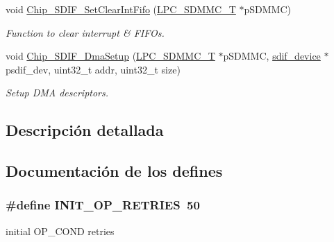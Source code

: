 \begin{DoxyCompactItemize}
void \hyperlink{group___s_d_i_f__18_x_x__43_x_x_ga8b2559327fedf08efe8a5e87ba6f6e54}{Chip\+\_\+\+S\+D\+I\+F\+\_\+\+Set\+Clear\+Int\+Fifo} (\hyperlink{struct_l_p_c___s_d_m_m_c___t}{L\+P\+C\+\_\+\+S\+D\+M\+M\+C\+\_\+T} $\ast$p\+S\+D\+M\+MC)
\begin{DoxyCompactList}\small\item\em Function to clear interrupt \& F\+I\+F\+Os. \end{DoxyCompactList}\item 
void \hyperlink{group___s_d_i_f__18_x_x__43_x_x_ga0c02401583b78fec76f6366730e1ff5f}{Chip\+\_\+\+S\+D\+I\+F\+\_\+\+Dma\+Setup} (\hyperlink{struct_l_p_c___s_d_m_m_c___t}{L\+P\+C\+\_\+\+S\+D\+M\+M\+C\+\_\+T} $\ast$p\+S\+D\+M\+MC, \hyperlink{group___s_d_i_f__18_x_x__43_x_x_ga14a605aa797cde1201ae414437a32292}{sdif\+\_\+device} $\ast$psdif\+\_\+dev, uint32\+\_\+t addr, uint32\+\_\+t size)
\begin{DoxyCompactList}\small\item\em Setup D\+MA descriptors. \end{DoxyCompactList}\end{DoxyCompactItemize}


\subsection{Descripción detallada}


\subsection{Documentación de los \textquotesingle{}defines\textquotesingle{}}
\subsubsection[{\texorpdfstring{I\+N\+I\+T\+\_\+\+O\+P\+\_\+\+R\+E\+T\+R\+I\+ES}{INIT_OP_RETRIES}}]{\setlength{\rightskip}{0pt plus 5cm}\#define I\+N\+I\+T\+\_\+\+O\+P\+\_\+\+R\+E\+T\+R\+I\+ES~50}\hypertarget{group___s_d_i_f__18_x_x__43_x_x_gaa5c496657573274b20f193c92686cd67}{}\label{group___s_d_i_f__18_x_x__43_x_x_gaa5c496657573274b20f193c92686cd67}
initial O\+P\+\_\+\+C\+O\+ND retries 

